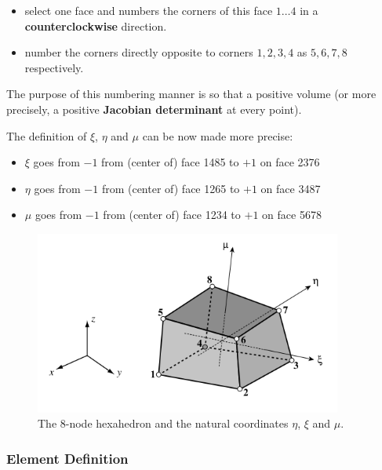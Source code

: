 \begin{itemize}
    \item select one face and numbers the corners of this face $ 1 \dots 4 $
          in a \textbf{counterclockwise} direction.
    \item number the corners directly opposite to corners $ 1, 2, 3, 4 $ as
          $ 5, 6, 7, 8 $ respectively.
\end{itemize}

The purpose of this numbering manner is so that a positive volume (or more
precisely, a positive \textbf{Jacobian determinant} at every point).

The definition of $ \xi $, $ \eta $ and $ \mu $ can be now made more precise:

\begin{itemize}
    \item $ \xi $ goes from $ -1 $ from (center of) face 1485 to $ +1 $ on face 2376
    \item $ \eta $ goes from $ -1 $ from (center of) face 1265 to $ +1 $ on face 3487
    \item $ \mu $ goes from $ -1 $ from (center of) face 1234 to $ +1 $ on face 5678
\end{itemize}

\begin{figure}[ht]
    \centering
    \includegraphics[width=0.90\textwidth]{img/hex8-node-numbers.png}
    \caption{The 8-node hexahedron and the natural coordinates $ \eta $, $ \xi $
    and $ \mu $.}
    \label{fig:hex8-node-numbers-png}
\end{figure}


\subsubsection{Element Definition}

